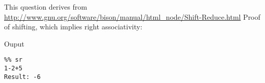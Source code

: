 This question derives from
\url{http://www.gnu.org/software/bison/manual/html_node/Shift-Reduce.html}
Proof of shifting, which implies right associativity:


Ouput
\begin{verbatim}
%% sr
1-2+5
Result: -6
\end{verbatim}

